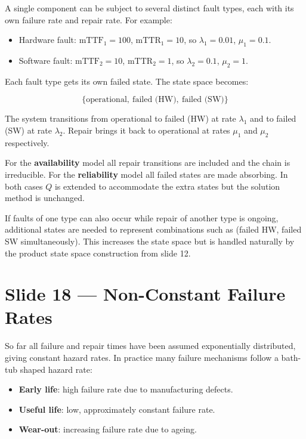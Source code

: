A single component can be subject to several distinct fault types, 
each with its own failure rate and repair rate. For example:

\begin{itemize}
    \item Hardware fault: $\mathrm{mTTF}_1 = 100$, 
    $\mathrm{mTTR}_1 = 10$, so $\lambda_1 = 0.01$, $\mu_1 = 0.1$.
    \item Software fault: $\mathrm{mTTF}_2 = 10$, 
    $\mathrm{mTTR}_2 = 1$, so $\lambda_2 = 0.1$, $\mu_2 = 1$.
\end{itemize}

Each fault type gets its own failed state. The state space becomes:

\[
    \{\text{operational},\ \text{failed (HW)},\ \text{failed (SW)}\}
\]

The system transitions from operational to failed (HW) at rate 
$\lambda_1$ and to failed (SW) at rate $\lambda_2$. Repair brings 
it back to operational at rates $\mu_1$ and $\mu_2$ respectively.

\begin{notebox}
    For the \textbf{availability} model all repair transitions are 
    included and the chain is irreducible. For the \textbf{reliability} 
    model all failed states are made absorbing. In both cases 
    $Q$ is extended to accommodate the extra states but the solution 
    method is unchanged.
\end{notebox}

\begin{warnbox}
    If faults of one type can also occur while repair of another 
    type is ongoing, additional states are needed to represent 
    combinations such as (failed HW, failed SW simultaneously). 
    This increases the state space but is handled naturally by the 
    product state space construction from slide 12.
\end{warnbox}

\section*{Slide 18 — Non-Constant Failure Rates}

So far all failure and repair times have been assumed exponentially 
distributed, giving constant hazard rates. In practice many failure 
mechanisms follow a bath-tub shaped hazard rate:

\begin{itemize}
    \item \textbf{Early life}: high failure rate due to manufacturing 
    defects.
    \item \textbf{Useful life}: low, approximately constant failure rate.
    \item \textbf{Wear-out}: increasing failure rate due to ageing.
\end{itemize}

